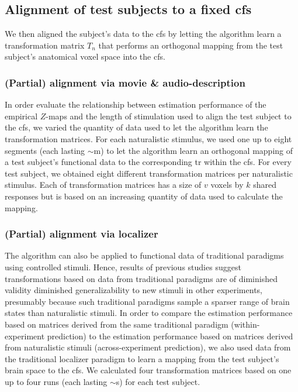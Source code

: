 \subsection{Alignment of test subjects to a fixed \ac{cfs}}




We then aligned the subject's data to the \ac{cfs} by letting the algorithm
learn a transformation matrix $T_{n}$ that performs an orthogonal mapping from
the test subject's anatomical voxel space into the \ac{cfs}.


\subsubsection{(Partial) alignment via movie \& audio-description}

In order evaluate the relationship between estimation performance of the
empirical $Z$-maps and the length of stimulation used to align the test subject
to the \ac{cfs}, we varied the quantity of data used to let the algorithm learn
the transformation matrices.
%
For each naturalistic stimulus, we used one up to eight segments (each lasting
$\sim$\unit[15]{m}) to let the algorithm learn an orthogonal mapping of a test
subject's functional data to the corresponding \acs{tr} within the \ac{cfs}.
%
For every test subject, we obtained eight different transformation matrices per
naturalistic stimulus.
%
Each of transformation matrices has a size of $v$ voxels by $k$ shared responses
but is based on an increasing quantity of data used to calculate the mapping.


\subsubsection{(Partial) alignment via localizer}

The algorithm can also be applied to functional data of traditional paradigms
using controlled stimuli.
%
Hence, results of previous studies \citep{guntupalli2016model, haxby2011common}
suggest transformations based on data from traditional paradigms are of
diminished validity diminished generalizability to new stimuli in other
experiments, presumably because such traditional paradigms sample a sparser
range of brain states than naturalistic stimuli.
%
In order to compare the estimation performance based on matrices derived from
the same traditional paradigm (within-experiment prediction) to the estimation
performance based on matrices derived from naturalistic stimuli
(across-experiment prediction), we also used data from the traditional localizer
paradigm to learn a mapping from the test subject's brain space to the \ac{cfs}.
%
We calculated four transformation matrices based on one
up to four runs (each lasting $\sim$\unit[312]{s}) for each test subject.



